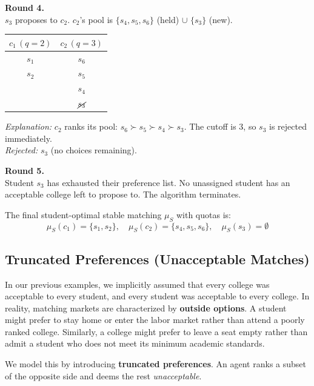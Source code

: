 {\medskip
\noindent\textbf{Round 4.} \\
$s_3$ proposes to $c_2$. $c_2$'s pool is $\{s_4, s_5, s_6\}$ (held) $\cup$ $\{s_3\}$ (new).
\begin{center}
\renewcommand{\arraystretch}{1.2}
\begin{tabular}{cc}
    $c_1 \,(q = 2 )$ & $c_2\, (q = 3)$ \\
    \hline
    $s_1$ & $s_6$ \\
    $s_2$ & $s_5$ \\
          & $s_4$ \\
          & $\cancel{s_3}$ \\
\end{tabular}
\end{center}
\textit{Explanation:} $c_2$ ranks its pool: $s_6 \succ s_5 \succ s_4 \succ s_3$. The cutoff is 3, so $s_3$ is rejected immediately. \\
\textit{Rejected:} $s_3$ (no choices remaining).

\medskip
\noindent\textbf{Round 5.} \\
Student $s_3$ has exhausted their preference list. No unassigned student has an acceptable college left to propose to. The algorithm terminates.

\vspace{0.3cm}
\noindent The final student-optimal stable matching $\mu_S$ with quotas is:
\[
  \mu_S(c_1) = \{s_1, s_2\}, \quad \mu_S(c_2) = \{s_4, s_5, s_6\}, \quad \mu_S(s_3) = \emptyset
\]
}

\subsection{Truncated Preferences (Unacceptable Matches)}

In our previous examples, we implicitly assumed that every college was acceptable to every student, and every student was acceptable to every college. In reality, matching markets are characterized by \textbf{outside options}. A student might prefer to stay home or enter the labor market rather than attend a poorly ranked college. Similarly, a college might prefer to leave a seat empty rather than admit a student who does not meet its minimum academic standards.

We model this by introducing \textbf{truncated preferences}. An agent ranks a subset of the opposite side and deems the rest \textit{unacceptable}.


